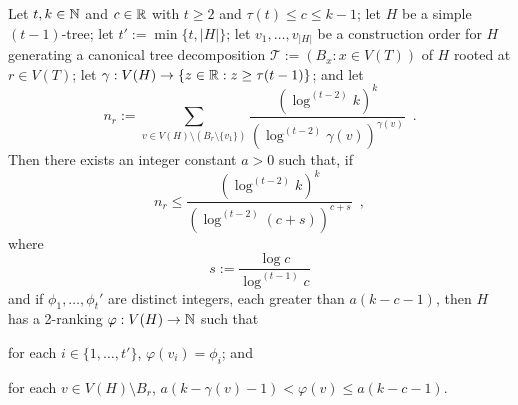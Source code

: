 \documentclass[kpfonts]{patmorin}
\theoremstyle{named}
\begin{document}
\begin{lem}\label{t-tree-slack}
Let $t,k\in\mathbb{N}$ and $c\in\mathbb{R}$ with $t\ge 2$ and $\tau(t)\le c\le k-1$; let $H$ be a simple $(t-1)$-tree; let $t':=\min\{t, |H|\}$; let $v_1,\ldots,v_{|H|}$ be a construction order for $H$ generating a canonical tree decomposition $\mathcal{T}:=(B_x:x\in V(T))$ of $H$ rooted at $r\in V(T)$; let $\gamma:V(H)\to\{z\in\mathbb{R}: z\ge \tau(t-1)\}$; and let
\[
    n_r:=\sum_{v\in V(H)\setminus (B_r\setminus\{v_1\})} \frac{\left(\log^{(t-2)} k\right)^k}{\left(\log^{(t-2)} \gamma(v)\right)^{\gamma(v)}} \enspace .
\]
Then there exists an integer constant $a>0$ such that,
if
\begin{equation}
     n_r \le \frac{(\log^{(t-2)} k)^k}{\left(\log^{(t-2)} (c + s)\right)^{c+s}} \enspace ,
 \label{total-weight-i}
\end{equation}
where
\[
    s := \frac{\log c}{\log^{(t-1)} c}
\]
and if $\phi_1,\ldots,\phi_t'$ are distinct integers, each greater than $a(k-c-1)$,
then $H$ has a 2-ranking $\varphi:V(H)\to\mathbb{N}$ such that
\begin{compactenum}[(P1)]
    \item for each $i\in\{1,\ldots,{t'}\}$, $\varphi(v_i)=\phi_i$; and
    \item for each $v\in V(H)\setminus B_r$, $a(k-\gamma(v)-1) < \varphi(v) \le a(k-c-1)$.
\end{compactenum}
\end{lem}
\end{document}
